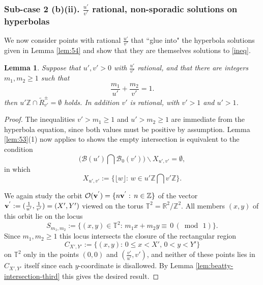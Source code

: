 \documentclass[12pt,letterpaper, reqno]{amsart}
\newtheorem{lem}[thm]{Lemma}
\theoremstyle{definition}
\theoremstyle{remark}
\newcommand{\RR}{\ensuremath{\mathbb{R}}}
\newcommand{\ZZ}{\ensuremath{\mathbb{Z}}}
\newcommand{\TT}{\mathbb{T}}
\newcommand{\uu}{{u'}}
\newcommand{\vv}{{v'}}
\newcommand{\sB}{{\mathcal B}}
\newcommand{\bbv}{{\bf v}^{'}}
\newcommand{\sO}{{\mathcal O}}
\newcommand{\floor}[1]{\lfloor{#1}\rfloor}
\begin{document}
%
\subsubsection{Sub-case 2 (b)(ii). $\frac{\uu}{\vv}$ rational, non-sporadic solutions on hyperbolas}\label{sec:552}

We now consider points with rational $\frac{\uu}{\vv}$ that  ``glue into" the hyperbola 
solutions given in Lemma \ref{lem:54} and show that they are  themselves solutions to \eqref{ineq}.

\begin{lem} \label{lem:511}
Suppose that   $\uu, \vv>0$ with  $\frac{\uu}{\vv}$ rational, and
that there are integers $m_1, m_2 \ge 1$ such that
$$
 \frac{m_1}{\uu}+ \frac{m_2}{ {\vv}}= 1.
$$
then $\uu \ZZ \cap  \widetilde{R}_{ \vv}^{\pm} = \emptyset$ holds.
In addition $\vv$ is rational, with  $ {\vv} >1$ and $\uu >1$.
\end{lem}

\begin{proof}
The inequalities $ {\vv} > m_1 \ge 1$ and $\uu >m_2 \ge 1$ are immediate
from the hyperbola equation, since both values must be positive by assumption. 
Lemma \ref{lem:53}(1) now applies to shows the empty intersection is equivalent to the condition
$$
 \bigg( \sB(\uu) \bigcap \sB_0(\vv)\bigg)  \smallsetminus  X_{\uu,\vv} = \emptyset,
 $$
 in which
$$ X_{\uu, {\vv}} := \{ \floor{w} : \, w \in \uu \ZZ \bigcap  {\vv} \ZZ\}.$$

We again study
 the orbit $\sO(\bbv) = \{ n \bbv : \, n\in \ZZ\}$ of the vector $\bbv := (\frac1{\uu}, \frac{1}{\vv}) = (X', Y')$
viewed on the torus $\TT^2 = \RR^2/\ZZ^2$. 
All members $(x,y)$ of this orbit lie on the locus
$$
S_{m_1, m_2} := \{ (x, y) \in \TT^2: \, m_1 x + m_2 y \equiv \, 0 \, (\bmod \, 1)\}.
$$
Since $m_1, m_2 \ge 1$ this locus intersects the closure of the rectangular  region 
$$C_{X', Y'} := \{ (x, y): \, 0 \le x < X', \, 0 < y< Y'\}$$
 on $\TT^2$
only in the points $(0,0)$ and $(\frac{\vv}{\uu}, \vv)$, and neither of these points lies in $C_{X',Y'}$ itself since each $y$-coordinate is disallowed.
By Lemma \ref{lem:beatty-intersection-third} this gives the desired result.
\end{proof}
 
%
%
\end{document}
